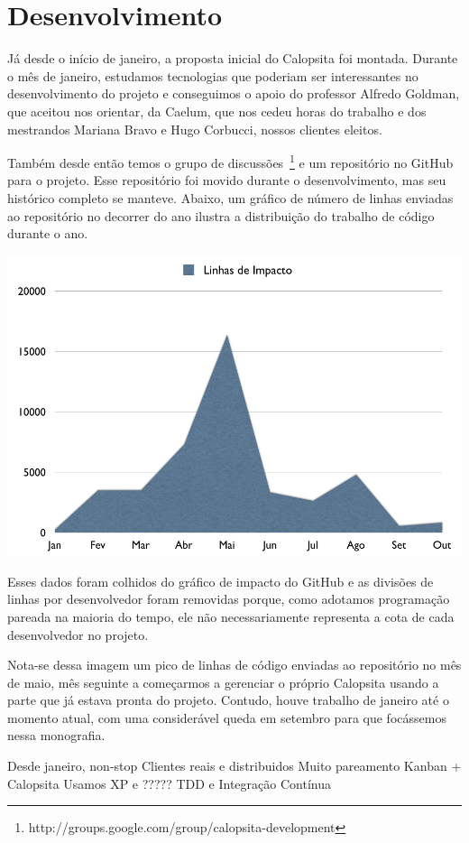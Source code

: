 \section{Desenvolvimento}

Já desde o início de janeiro, a proposta inicial do Calopsita foi montada. Durante o mês de janeiro, estudamos tecnologias que poderiam ser interessantes no desenvolvimento do projeto e conseguimos o apoio do professor Alfredo Goldman, que aceitou nos orientar, da Caelum, que nos cedeu horas do trabalho e dos mestrandos Mariana Bravo e Hugo Corbucci, nossos clientes eleitos.

Também desde então temos o grupo de discussões~\footnote{http://groups.google.com/group/calopsita-development} e um repositório no GitHub para o projeto. Esse repositório foi movido durante o desenvolvimento, mas seu histórico completo se manteve. Abaixo, um gráfico de número de linhas enviadas ao repositório no decorrer do ano ilustra a distribuição do trabalho de código durante o ano.

\includegraphics[scale=0.4]{images/impacto.png}

Esses dados foram colhidos do gráfico de impacto do GitHub e as divisões de linhas por desenvolvedor foram removidas porque, como adotamos programação pareada na maioria do tempo, ele não necessariamente representa a cota de cada desenvolvedor no projeto.

Nota-se dessa imagem um pico de linhas de código enviadas ao repositório no mês de maio, mês seguinte a começarmos a gerenciar o próprio Calopsita usando a parte que já estava pronta do projeto. Contudo, houve trabalho de janeiro até o momento atual, com uma considerável queda em setembro para que focássemos nessa monografia.

Desde janeiro, non-stop
Clientes reais e distribuidos
Muito pareamento
Kanban + Calopsita
Usamos XP e ?????
TDD e Integração Contínua

